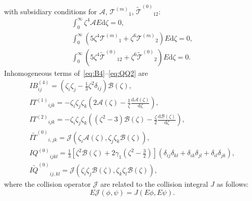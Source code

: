 \documentclass[review]{elsarticle}
\newcommand{\dd}{\mathrm{d}}
\newcommand{\der}[2][]{\frac{\dd#1}{\dd#2}}
\newcommand{\T}[1]{\ensuremath{\mathcal{T}^{(#1)}}}
\newcommand{\TT}{\ensuremath{\tilde{\mathcal{T}}^{(0)}}}
\newcommand{\IF}[2][0]{\ensuremath{I{#2}^{(#1)}}}
\newcommand{\IFF}[1]{\ensuremath{I\tilde{#1}^{(0)}}}
\newcommand{\ZZZ}{\zeta_i\zeta_j\zeta_k}
\newcommand{\DD}[2]{\delta_{#1}\delta_{#2}}
\begin{document}
with subsidiary conditions for \(\mathcal{A}\), \(\T{m}_1\), \(\TT_{12}\):
\begin{gather}
    \int_0^\infty \zeta^4 \mathcal{A} E \dd\zeta = 0, \label{eq:A_constraint}\\
    \int_0^\infty \left( 5\zeta^4\T{m}_1 + \zeta^6\T{m}_2 \right) E \dd\zeta = 0, \label{eq:Tm_constraint}\\
    \int_0^\infty \left( 5\zeta^4\TT_{12} + \zeta^6\TT_2 \right) E \dd\zeta = 0. \label{eq:T12_constraint}
\end{gather}
Inhomogeneous terms of~\eqref{eq:B4}--\eqref{eq:QQ2} are
\begin{gather}
    IB^{(4)}_{ij} = \left(\zeta_i\zeta_j-\frac13\zeta^2\delta_{ij}\right)\mathcal{B}(\zeta), \\
    \IF[1]{T}_{ijk} = -\ZZZ\left( 2\mathcal{A}(\zeta) - \frac1\zeta \der[\mathcal{A}(\zeta)]{\zeta} \right), \\
    \IF[2]{T}_{ijk} = -\ZZZ\left( (\zeta^2-3)\mathcal{B}(\zeta) - \frac\zeta2 \der[\mathcal{B}(\zeta)]{\zeta} \right), \\
    \IFF{T}_{i,jk} = \mathcal{J}(\zeta_i\mathcal{A}(\zeta), \zeta_j\zeta_k\mathcal{B}(\zeta)), \\
    \IF{Q}_{ijkl} = \frac13\left[\zeta^2\mathcal{B}(\zeta)+2\gamma_1\left(\zeta^2-\frac32\right)\right]
        (\DD{ij}{kl}+\DD{ik}{jl}+\DD{il}{jk}), \\
    \IFF{Q}_{ij,kl} = \mathcal{J}(\zeta_i\zeta_j\mathcal{B}(\zeta), \zeta_k\zeta_l\mathcal{B}(\zeta)),
\end{gather}
where the collision operator \(\mathcal{J}\) are related to the collision integral \(J\) as follows:
\begin{equation}\label{eq:mathcalJ}
    E\mathcal{J}(\phi, \psi) = J(E\phi, E\psi).
\end{equation}
\end{document}
